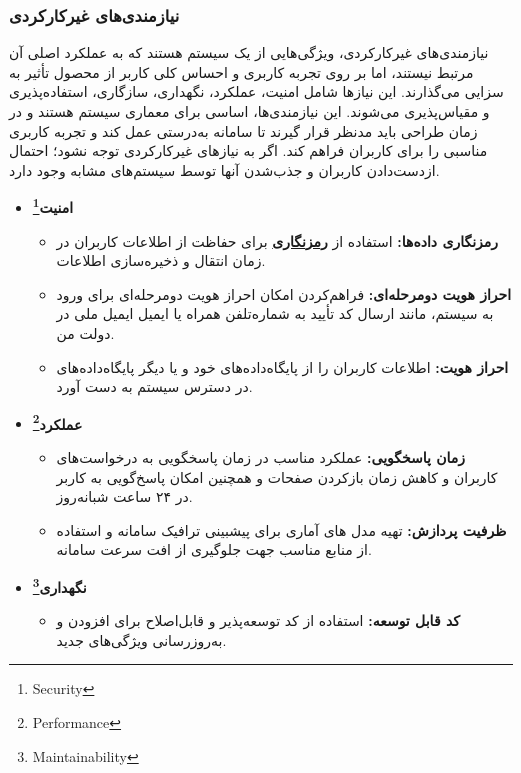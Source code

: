 \documentclass[12pt,a4paper,oneside]{article}
\begin{document}
			\subsubsection{نیازمندی‌های غیرکارکردی}
			نیازمندی‌های غیرکارکردی، ویژگی‌هایی از یک سیستم هستند که به عملکرد اصلی آن مرتبط نیستند، اما بر روی تجربه کاربری و احساس کلی کاربر از محصول تأثیر به سزایی می‌گذارند. این نیازها شامل امنیت، عملکرد، نگهداری، سازگاری، استفاده‌پذیری و مقیاس‌پذیری می‌شوند. این نیازمندی‌ها، اساسی برای معماری سیستم هستند و در زمان طراحی باید مدنظر قرار گیرند تا سامانه به‌درستی عمل کند و تجربه کاربری مناسبی را برای کاربران فراهم کند. اگر به نیازهای غیرکارکردی توجه نشود؛ احتمال ازدست‌دادن کاربران و جذب‌شدن آنها توسط سیستم‌های مشابه وجود دارد.
			\begin{itemize}
				\item \textbf{امنیت\footnote{Security}}
				\begin{itemize}
					\item \textbf{رمزنگاری داده‌ها:}
					استفاده از 
					\hyperref[ref:encryption]{\textbf{رمزنگاری}}
					 برای حفاظت از اطلاعات کاربران در زمان انتقال و ذخیره‌سازی اطلاعات.
					
					\item \textbf{احراز هویت دومرحله‌ای:}
					فراهم‌کردن امکان احراز هویت دومرحله‌ای برای ورود به سیستم، مانند ارسال کد تأیید به شماره‌تلفن همراه یا ایمیل ایمیل ملی در دولت من.
					
					\item \textbf{احراز هویت:}
					اطلاعات کاربران را از پایگاه‌داده‌های خود و یا دیگر پایگاه‌داده‌های در دسترس سیستم به دست آورد.
					
				\end{itemize}
				
				\item \textbf{عملکرد\footnote{Performance}}
				\begin{itemize}
					\item \textbf{زمان پاسخگویی:}
					عملکرد مناسب در زمان پاسخگویی به درخواست‌های کاربران و کاهش زمان بازکردن صفحات و همچنین امکان پاسخ‌گویی به کاربر در ۲۴ ساعت شبانه‌روز.
					
					\item \textbf{ظرفیت پردازش:}	
					تهیه مدل های آماری برای پیشبینی ترافیک سامانه و استفاده از منابع مناسب جهت جلوگیری از  افت سرعت سامانه.
				\end{itemize}
				
				\item \textbf{نگهداری\footnote{Maintainability}}
				\begin{itemize}
					\item \textbf{کد قابل توسعه:}
					استفاده از کد توسعه‌پذیر و قابل‌اصلاح برای افزودن و به‌روزرسانی ویژگی‌های جدید.
					

\end{itemize}
\end{itemize}
\end{document}
